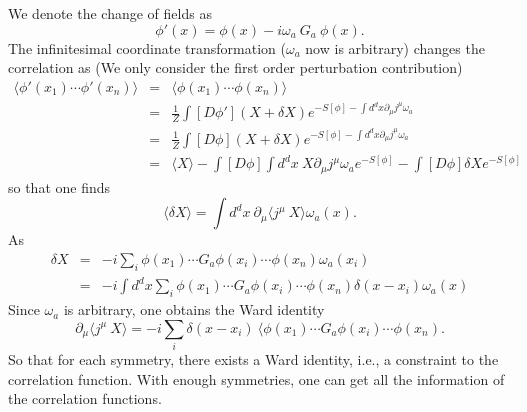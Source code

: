 \documentclass[submission, PhysLectNotes]{SciPost}
\begin{document}
We denote the change of fields as
\begin{equation}
    \phi'(x) = \phi(x) -i\omega_a\ G_a\ \phi(x).
\end{equation}
The infinitesimal coordinate transformation ($\omega_a$ now is arbitrary) changes the correlation as (We only consider the first order perturbation contribution)
\begin{eqnarray}
\langle \phi'(x_1)\cdots  \phi'(x_n)\rangle &=& \langle \phi(x_1)\cdots  \phi(x_n)\rangle \\
&=& \frac{1}{Z} \int [D\phi'] (X+\delta X) e^{-S[\phi] - \int d^d x\partial_\mu j^\mu \omega_a} \\
&=& \frac{1}{Z} \int [D\phi] (X+\delta X) e^{-S[\phi] - \int d^d x\partial_\mu j^\mu \omega_a} \\
&=& \langle X \rangle - \int [D\phi] \int d^d x\ X \partial_\mu j^\mu \omega_a e^{-S[\phi]} - \int [D\phi] \delta X  e^{-S[\phi]}
\end{eqnarray}
so that one finds
\begin{equation}
    \langle\delta X\rangle = \int d^d x \ \partial_\mu\langle j^\mu \ X\rangle \omega_a(x).
\end{equation}
As
\begin{eqnarray}
\delta X &=& -i \sum_i \phi(x_1)\cdots G_a \phi(x_i)\cdots \phi(x_n)\omega_a(x_i) \\
&=& -i \int d^d x \sum_i \phi(x_1)\cdots G_a \phi(x_i)\cdots \phi(x_n)\delta(x-x_i)\omega_a(x)
\end{eqnarray}
Since $\omega_a$ is arbitrary, one obtains the Ward identity
\begin{equation}
    \partial_\mu\langle j^\mu \ X\rangle = -i \sum_i \delta(x-x_i)\ \langle \phi(x_1)\cdots G_a \phi(x_i)\cdots \phi(x_n).
\end{equation}
So that for each symmetry, there exists a Ward identity, i.e., a constraint to the correlation function. With enough symmetries, one can get all the information of the correlation functions.
\end{document}
